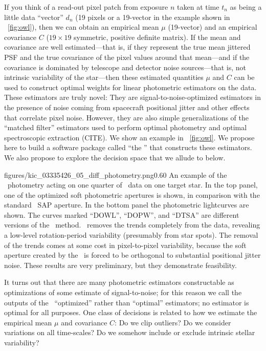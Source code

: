 \documentclass[letterpaper,12pt,preprint]{hack_aastex}
\begin{document}
If you think of a read-out pixel patch from exposure $n$ taken at time
$t_n$ as being a little data ``vector'' $d_n$ (19 pixels or a 19-vector
in the example shown in \figurename~\ref{fig:owl}), then we can obtain an
empirical mean $\mu$ (19-vector) and an empirical covariance $C$ ($19\times 19$
symmetric, positive definite matrix).
If the mean and covariance are well estimated---that is, if they
represent the true mean jittered PSF and the true covariance of the
pixel values around that mean---and if the covariance is dominated by
telescope and detector noise sources---that is, not intrinsic
variability of the star---then these estimated quantities $\mu$ and
$C$ can be used to construct optimal weights for linear photometric
estimators on the data.
These estimators are truly novel:
They are signal-to-noise-optimized estimators in the presence of noise coming
from spacecraft positional jitter and other effects that correlate pixel noise.
However, they are also simple generalizations of the ``matched filter''
estimators used to perform optimal photometry and optimal spectroscopic
extraction (CITE).
We show an example in \figurename~\ref{fig:owl}.
We propose here to build a software package called ``the \OWL'' that constructs
these estimators.
We also propose to explore the decision space that we allude to below.

%
            {figures/kic_03335426_05_diff_photometry.png}{0.60}{%
An example of the \OWL\ photometry acting on one quarter of \Kepler\ data
on one target star.
In the top panel, one of the optimized soft photometric apertures is shown,
in comparison with the standard \Kepler\ SAP aperture.
In the bottom panel the photometric lightcurves are shown.
The curves marked ``DOWL'', ``DOPW'', and ``DTSA'' are different versions of the
\OWL\ method.
\OWL\ removes the trends completely from the data,
revealing a low-level rotation-period variability (presumably from star spots).
The removal of the trends comes at some cost in pixel-to-pixel variability,
because the soft aperture created by the \OWL\ is forced to be orthogonal to
substantial positional jitter noise.
These results are very preliminary, but they demonstrate feasibility.
\label{fig:owl}}

It turns out that there are many photometric estimators constructable as
optimizations of some estimate of signal-to-noise; for this reason we call
the outputs of the \OWL\ ``optimized'' rather than ``optimal'' estimators;
no estimator is optimal for all purposes.
One class of decisions is related to how we estimate the empirical mean $\mu$
and covariance $C$:
Do we clip outliers?
Do we consider variations on all time-scales?
Do we somehow include or exclude intrinsic stellar variability?
\end{document}
